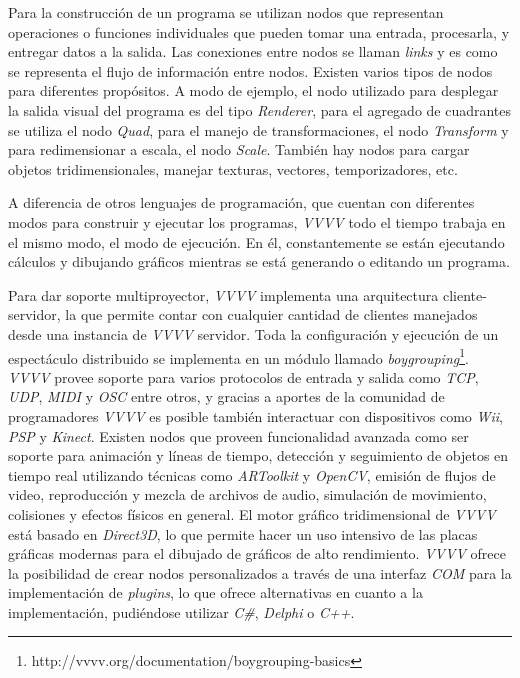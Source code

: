 Para la construcción de un programa se utilizan nodos que representan operaciones o funciones individuales que pueden tomar una entrada, procesarla, y entregar datos a la salida. Las conexiones entre nodos se llaman \emph{links} y es como se representa el flujo de información entre nodos.
Existen varios tipos de nodos para diferentes propósitos. A modo de ejemplo, el nodo utilizado para desplegar la salida visual del programa es del tipo \emph{Renderer}, para el agregado de cuadrantes se utiliza el nodo \emph{Quad}, para el manejo de transformaciones, el nodo \emph{Transform} y para redimensionar a escala, el nodo \emph{Scale}. También hay nodos para cargar objetos tridimensionales, manejar texturas, vectores, temporizadores, etc.

A diferencia de otros lenguajes de programación, que cuentan con diferentes modos para construir y ejecutar los programas, \emph{VVVV} todo el tiempo trabaja en el mismo modo, el modo de ejecución. En él, constantemente se están ejecutando cálculos y dibujando gráficos mientras se está generando o editando un programa.

Para dar soporte multiproyector, \emph{VVVV} implementa una arquitectura cliente-servidor, la que permite contar con cualquier cantidad de clientes manejados desde una instancia de \emph{VVVV} servidor. Toda la configuración y ejecución de un espectáculo distribuido se implementa en un módulo llamado \emph{boygrouping}\footnote{http://vvvv.org/documentation/boygrouping-basics}.
\emph{VVVV} provee soporte para varios protocolos de entrada y salida como \emph{TCP}, \emph{UDP}, \emph{MIDI} y \emph{OSC} entre otros, y gracias a aportes de la comunidad de programadores \emph{VVVV} es posible también interactuar con dispositivos como \emph{Wii}, \emph{PSP} y \emph{Kinect}. Existen nodos que proveen funcionalidad avanzada como ser soporte para animación y líneas de tiempo, detección y seguimiento de objetos en tiempo real utilizando técnicas como \emph{ARToolkit} y \emph{OpenCV}, emisión de flujos de video, reproducción y mezcla de archivos de audio, simulación de movimiento, colisiones y efectos físicos en general.
El motor gráfico tridimensional de \emph{VVVV} está basado en \emph{Direct3D}, lo que permite hacer un uso intensivo de las placas gráficas modernas para el dibujado de gráficos de alto rendimiento.
\emph{VVVV} ofrece la posibilidad de crear nodos personalizados a través de una interfaz \emph{COM} para la implementación de \emph{plugins}, lo que ofrece alternativas en cuanto a la implementación, pudiéndose utilizar \emph{C\#}, \emph{Delphi} o \emph{C++}.

